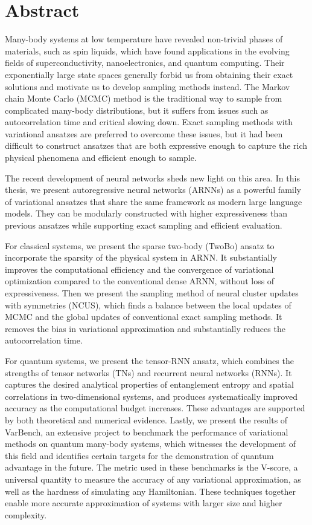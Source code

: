 \cleardoublepage
\chapter*{Abstract}

Many-body systems at low temperature have revealed non-trivial phases of materials, such as spin liquids, which have found applications in the evolving fields of superconductivity, nanoelectronics, and quantum computing.
Their exponentially large state spaces generally forbid us from obtaining their exact solutions and motivate us to develop sampling methods instead.
The Markov chain Monte Carlo (MCMC) method is the traditional way to sample from complicated many-body distributions, but it suffers from issues such as autocorrelation time and critical slowing down.
Exact sampling methods with variational ansatzes are preferred to overcome these issues, but it had been difficult to construct ansatzes that are both expressive enough to capture the rich physical phenomena and efficient enough to sample.

The recent development of neural networks sheds new light on this area.
In this thesis, we present autoregressive neural networks (ARNNs) as a powerful family of variational ansatzes that share the same framework as modern large language models.
They can be modularly constructed with higher expressiveness than previous ansatzes while supporting exact sampling and efficient evaluation.

For classical systems, we present the sparse two-body (TwoBo) ansatz to incorporate the sparsity of the physical system in ARNN.
It substantially improves the computational efficiency and the convergence of variational optimization compared to the conventional dense ARNN, without loss of expressiveness.
Then we present the sampling method of neural cluster updates with symmetries (NCUS), which finds a balance between the local updates of MCMC and the global updates of conventional exact sampling methods.
It removes the bias in variational approximation and substantially reduces the autocorrelation time.

For quantum systems, we present the tensor-RNN ansatz, which combines the strengths of tensor networks (TNs) and recurrent neural networks (RNNs).
It captures the desired analytical properties of entanglement entropy and spatial correlations in two-dimensional systems, and produces systematically improved accuracy as the computational budget increases.
These advantages are supported by both theoretical and numerical evidence.
Lastly, we present the results of VarBench, an extensive project to benchmark the performance of variational methods on quantum many-body systems, which witnesses the development of this field and identifies certain targets for the demonstration of quantum advantage in the future.
The metric used in these benchmarks is the V-score, a universal quantity to measure the accuracy of any variational approximation, as well as the hardness of simulating any Hamiltonian.
These techniques together enable more accurate approximation of systems with larger size and higher complexity.

